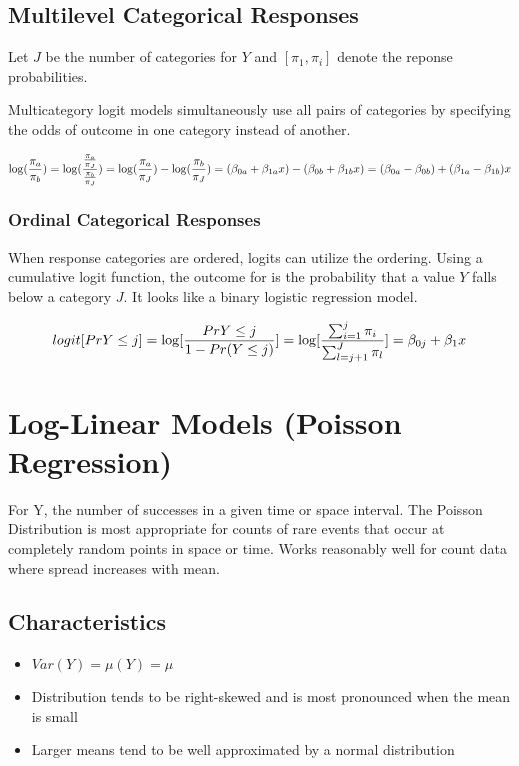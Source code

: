 \documentclass[11pt]{article}
\begin{document}
\subsection{Multilevel Categorical Responses}
\label{sec:orgc6236bf}
Let \(J\) be the number of categories for \(Y\) and \([\pi_1, \pi_i]\) denote
the reponse probabilities.

Multicategory logit models simultaneously use all pairs of categories by
specifying the odds of outcome in one category instead of another.

$$
    \log(\frac{\pi_a}{\pi_b}) = \log(\frac{\frac{\pi_a}{\pi_J}}{\frac{\pi_b}{\pi_J}}) = \log(\frac{\pi_a}{\pi_J}) - \log(\frac{\pi_b}{\pi_J}) \newline
    = (\beta_{0a} + \beta_{1a}x) - (\beta_{0b} + \beta_{1b}x) \newline
    = (\beta_{0a} - \beta_{0b}) + (\beta_{1a} - \beta_{1b})x
$$

\subsubsection{Ordinal Categorical Responses}
\label{sec:orgaf59762}
When response categories are ordered, logits can utilize the ordering.
Using a cumulative logit function, the outcome for is the probability
that a value \(Y\) falls below a category \(J\). It looks like a binary
logistic regression model.

$$
    logit[Pr{Y \leq j}] \newline 
    = \log[\frac{Pr{Y \leq j}}{1 - Pr(Y \leq j)}] \newline 
    = \log[\frac{\sum_{i = 1}^j \pi_i}{\sum_{l = j + 1}^J\pi_l}] \newline
    = \beta_{0j} + \beta_1x
$$

\section{Log-Linear Models (Poisson Regression)}
\label{sec:org83338f7}
For Y, the number of successes in a given time or space interval. The
Poisson Distribution is most appropriate for counts of rare events that
occur at completely random points in space or time. Works reasonably
well for count data where spread increases with mean.

\subsection{Characteristics}
\label{sec:orgbb0f484}
\begin{itemize}
\item \(Var(Y) = \mu(Y) = \mu\)
\item Distribution tends to be right-skewed and is most pronounced when the
mean is small
\item Larger means tend to be well approximated by a normal distribution
\end{itemize}
\end{document}
